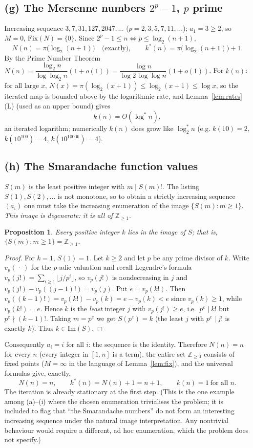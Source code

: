 \documentclass[12pt]{article}
\newtheorem{proposition}{Proposition}
\theoremstyle{definition}
\begin{document}
\subsection{(g) The Mersenne numbers $2^p-1$, $p$ prime}
Increasing sequence $3,7,31,127,2047,\dots$ ($p=2,3,5,7,11,\dots$); $a_1=3\ge2$, so
$M=0$, $\mathrm{Fix}(N)=\{0\}$. Since $2^p-1\le n\iff p\le\log_2(n+1)$,
\[
  N(n)=\pi\bigl(\log_2(n+1)\bigr)\quad\text{(exactly)},\qquad
  k^*(n)=\pi\bigl(\log_2(n+1)\bigr)+1.
\]
By the Prime Number Theorem $N(n)=\dfrac{\log_2 n}{\log\log_2 n}(1+o(1))
=\dfrac{\log n}{\log2\,\log\log n}(1+o(1))$. For $k(n)$: for all large $x$,
$N(x)=\pi(\log_2(x+1))\le\log_2(x+1)\le\log x$, so the iterated map is bounded above
by the logarithmic rate, and Lemma~\ref{lem:rates}(L) (used as an upper bound) gives
\[
  k(n)=O(\log^* n),
\]
an iterated logarithm; numerically $k(n)$ does grow like $\log^*_2 n$ (e.g.
$k(10)=2$, $k(10^{100})=4$, $k(10^{10000})=4$).

\subsection{(h) The Smarandache function values}
$S(m)$ is the least positive integer with $m\mid S(m)!$. The listing $S(1),S(2),\dots$
is not monotone, so to obtain a strictly increasing sequence $(a_i)$ one must take the
increasing enumeration of the image $\{S(m):m\ge1\}$. \emph{This image is degenerate:
it is all of $\mathbb Z_{\ge1}$.}

\begin{proposition}\label{prop:smar}
Every positive integer $k$ lies in the image of $S$; that is, $\{S(m):m\ge1\}=\mathbb
Z_{\ge1}$.
\end{proposition}

\begin{proof}
For $k=1$, $S(1)=1$. Let $k\ge2$ and let $p$ be any prime divisor of $k$. Write
$v_p(\,\cdot\,)$ for the $p$-adic valuation and recall Legendre's formula
$v_p(j!)=\sum_{i\ge1}\lfloor j/p^i\rfloor$, so $v_p(j!)$ is nondecreasing in $j$ and
$v_p(j!)-v_p((j-1)!)=v_p(j)$. Put $e=v_p(k!)$. Then
$v_p((k-1)!)=v_p(k!)-v_p(k)=e-v_p(k)<e$ since $v_p(k)\ge1$, while $v_p(k!)=e$. Hence
$k$ is the \emph{least} integer $j$ with $v_p(j!)\ge e$, i.e.\ $p^e\mid k!$ but
$p^e\nmid (k-1)!$. Taking $m=p^e$ we get $S(p^e)=k$ (the least $j$ with $p^e\mid j!$
is exactly $k$). Thus $k\in\mathrm{Im}(S)$.
\end{proof}

Consequently $a_i=i$ for all $i$: the sequence is the identity. Therefore $N(n)=n$ for
every $n$ (every integer in $[1,n]$ is a term), the entire set $\mathbb Z_{\ge0}$
consists of fixed points ($M=\infty$ in the language of Lemma~\ref{lem:fix}), and the
universal formulas give, exactly,
\[
  N(n)=n,\qquad k^*(n)=N(n)+1=n+1,\qquad k(n)=1\ \text{for all }n .
\]
The iteration is already stationary at the first step. (This is the one example among
(a)--(i) where the chosen enumeration trivialises the problem; it is included to
flag that ``the Smarandache numbers'' do not form an interesting increasing sequence
under the natural image interpretation. Any nontrivial behaviour would require a
different, ad hoc enumeration, which the problem does not specify.)
\end{document}
